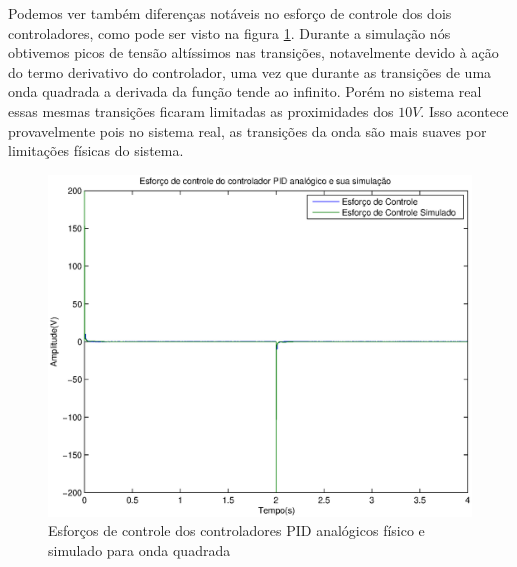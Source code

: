 \documentclass{article}
\begin{document}
Podemos ver também diferenças notáveis no esforço de controle dos dois controladores, como pode ser visto na figura \ref{fig:ursim}. Durante a simulação nós obtivemos picos de tensão altíssimos nas transições, notavelmente devido à ação do termo derivativo do controlador, uma vez que durante as transições de uma onda quadrada a derivada da função tende ao infinito. Porém no sistema real essas mesmas transições ficaram limitadas as proximidades dos $10V$. Isso acontece provavelmente pois no sistema real, as transições da onda são mais suaves por limitações físicas do sistema.
\begin{figure}[H]
	\centering
	\includegraphics[width=0.8\linewidth]{ursim}
	\caption{Esforços de controle dos controladores PID analógicos físico e simulado para onda quadrada}
	\label{fig:ursim}
\end{figure}
\end{document}
